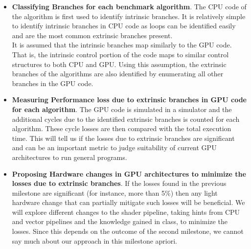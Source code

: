 \begin{itemize}

\item \textbf{Classifying Branches for each benchmark algorithm}. The CPU code of the algorithm is first used to identify intrinsic branches. It is relatively simple to identify intrinsic branches in CPU code as loops can be identified easily and are the most common extrinsic branches present.
\\
It is assumed that the intrinsic branches map similarly to the GPU code. That is, the intrinsic control portion of the code maps to similar control structures to both CPU and GPU. Using this assumption, the extrinsic branches of the algorithms are also identified by enumerating all other branches in the GPU code.

\item \textbf{Measuring Performance loss due to extrinsic branches in GPU code for each algorithm}. The GPU code is simulated in a simulator and the additional cycles due to the identified extrinsic branches is counted for each algorithm. These cycle losses are then compared with the total execution time. This will tell us if the losses due to extrinsic branches are significant and can be an important metric to judge suitability of current GPU architectures to run general programs.

\item \textbf{Proposing Hardware changes in GPU architectures to minimize the losses due to extrinsic branches}. If the losses found in the previous milestone are significant (for instance, more than 5\%) then any light hardware change that can partially mitigate such losses will be beneficial. We will explore different changes to the shader pipeline, taking hints from CPU and vector pipelines and the knowledge gained in class, to minimize the losses. Since this depends on the outcome of the second milestone, we cannot say much about our approach in this milestone apriori. 

\end{itemize}
